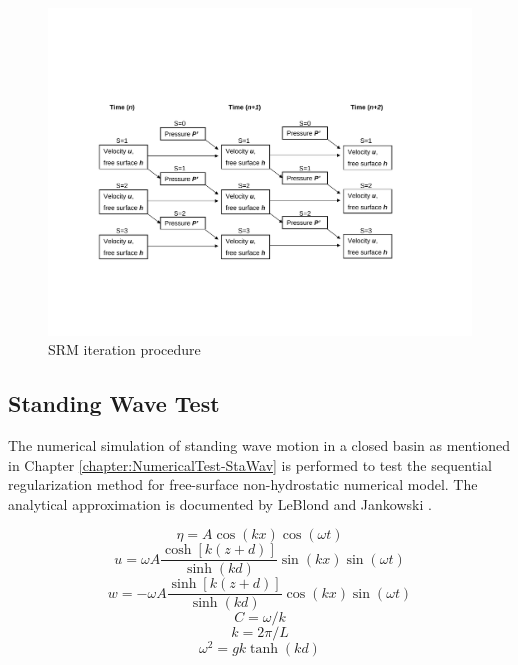 \vspace{1in}

\begin{figure}[h]
  \begin{center}
    \includegraphics[width=5.5in]{../figures/SRM/SRM-chart.pdf}
    \caption{SRM iteration procedure}
    \label{fig:SRM-iteration}
  \end{center}
\end{figure}
\cp

\subsection{Standing Wave Test}

The numerical simulation of standing wave motion in a closed basin as mentioned in Chapter \ref{chapter:NumericalTest-StaWav} is performed to test the sequential regularization method for free-surface non-hydrostatic numerical model. The analytical approximation is documented by LeBlond \cite{LeBlond1978} and Jankowski \cite{Jankowski1999}.

\begin{equation}
\eta = A \cos(kx)\cos(\omega t)
\end{equation}
\begin{equation}
u=\omega A \frac{\cosh[k(z+d)]}{\sinh(kd)}\sin(kx)\sin(\omega t)
\end{equation}
\begin{equation}
w=-\omega A \frac{\sinh[k(z+d)]}{\sinh(kd)}\cos(kx)\sin(\omega t)
\end{equation}
\begin{equation}
C= \omega /k
\end{equation}
\begin{equation}
k=2 \pi/L
\end{equation}
\begin{equation}
\omega^2=gk \tanh(kd)
\end{equation}

